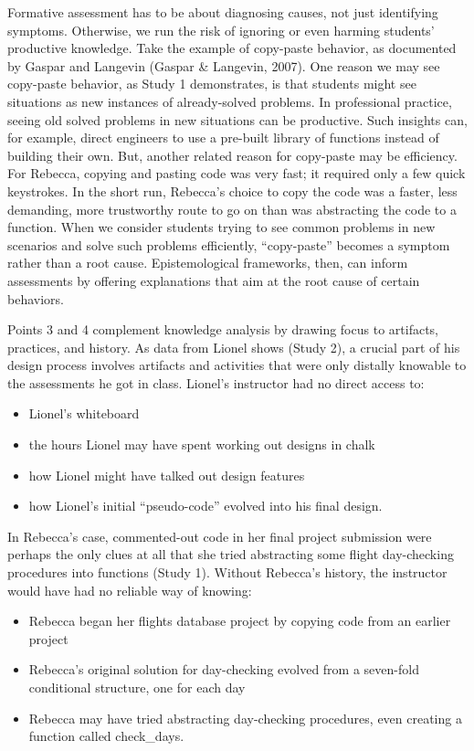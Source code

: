 Formative assessment has to be about diagnosing causes, not just
identifying symptoms. Otherwise, we run the risk of ignoring or even
harming students' productive knowledge. Take the example of copy-paste
behavior, as documented by Gaspar and Langevin (Gaspar \& Langevin,
2007). One reason we may see copy-paste behavior, as Study 1
demonstrates, is that students might see situations as new instances of
already-solved problems. In professional practice, seeing old solved
problems in new situations can be productive. Such insights can, for
example, direct engineers to use a pre-built library of functions
instead of building their own. But, another related reason for
copy-paste may be efficiency. For Rebecca, copying and pasting code was
very fast; it required only a few quick keystrokes. In the short run,
Rebecca's choice to copy the code was a faster, less demanding, more
trustworthy route to go on than was abstracting the code to a function.
When we consider students trying to see common problems in new scenarios
and solve such problems efficiently, ``copy-paste'' becomes a symptom
rather than a root cause. Epistemological frameworks, then, can inform
assessments by offering explanations that aim at the root cause of
certain behaviors.

Points 3 and 4 complement knowledge analysis by drawing focus to
artifacts, practices, and history. As data from Lionel shows (Study 2),
a crucial part of his design process involves artifacts and activities
that were only distally knowable to the assessments he got in class.
Lionel's instructor had no direct access to:

\begin{itemize}
\item
  Lionel's whiteboard
\item
  the hours Lionel may have spent working out designs in chalk
\item
  how Lionel might have talked out design features
\item
  how Lionel's initial ``pseudo-code'' evolved into his final design.
\end{itemize}

In Rebecca's case, commented-out code in her final project submission
were perhaps the only clues at all that she tried abstracting some
flight day-checking procedures into functions (Study 1). Without
Rebecca's history, the instructor would have had no reliable way of
knowing:

\begin{itemize}
\item
  Rebecca began her flights database project by copying code from an
  earlier project
\item
  Rebecca's original solution for day-checking evolved from a seven-fold
  conditional structure, one for each day
\item
  Rebecca may have tried abstracting day-checking procedures, even
  creating a function called check\_days.
\end{itemize}

